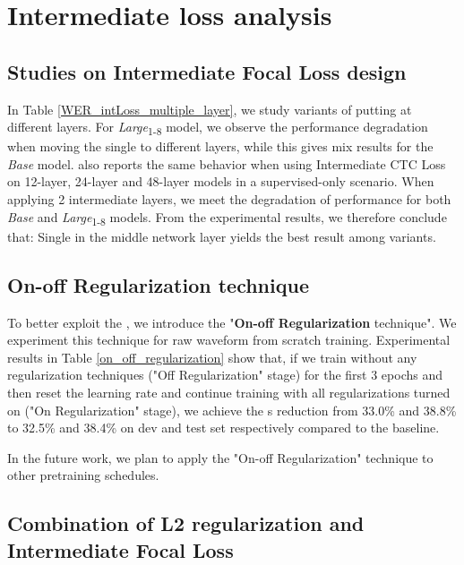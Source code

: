 \section{Intermediate loss analysis}

\subsection{Studies on Intermediate Focal Loss design}



In Table \ref{WER_intLoss_multiple_layer}, we study variants of putting  at different layers. 
For \textit{Large}\textsubscript{1-8} model, we observe the performance degradation when moving the single  to different layers, while this gives mix results for the \textit{Base} model.
\cite{lee2021intermediate} also reports the same behavior when using Intermediate CTC Loss on 12-layer, 24-layer and 48-layer models in a supervised-only scenario. 
When applying 2 intermediate layers, we meet the degradation of performance for both \textit{Base} and \textit{Large}\textsubscript{1-8} models. 
From the experimental results, we therefore conclude that: Single  in the middle network layer yields the best result among variants.


\subsection{On-off Regularization technique}



To better exploit the , we introduce the "\textbf{On-off Regularization} technique". 
We experiment this technique for raw waveform from scratch training.
Experimental results in Table \ref{on_off_regularization} show that, if we train without any regularization techniques ("Off Regularization" stage) for the first 3 epochs and then reset the learning rate and continue training with all regularizations turned on ("On Regularization" stage), we achieve the s reduction from 33.0\% and 38.8\% to 32.5\% and 38.4\% on dev and test set respectively compared to the baseline. 

In the future work, we plan to apply the "On-off Regularization" technique to other pretraining schedules.

\subsection{Combination of L2 regularization and Intermediate Focal Loss}

